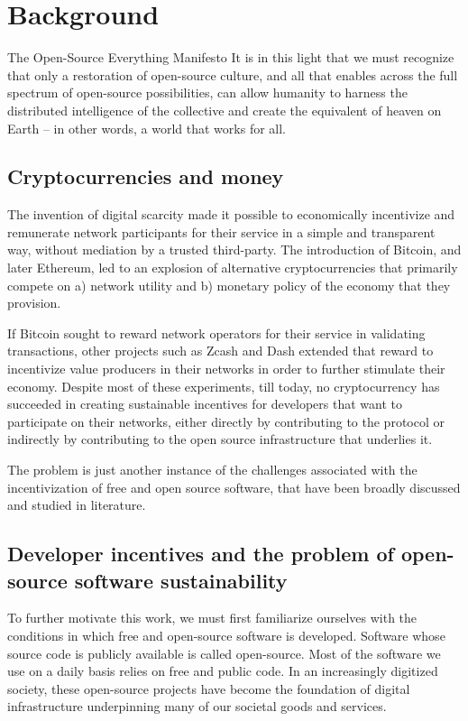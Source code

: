 \section{Background}

\begin{epigraph}{The Open-Source Everything Manifesto}
    \noindent It is in this light that we must recognize that only a restoration of
    open-source culture, and all that enables across the full spectrum of
    open-source possibilities, can allow humanity to harness the distributed
    intelligence of the collective and create the equivalent of heaven on Earth
    -- in other words, a world that works for all.
\end{epigraph}

\subsection{Cryptocurrencies and money}

The invention of digital scarcity made it possible to economically incentivize
and remunerate network participants for their service in a simple and transparent
way, without mediation by a trusted third-party. The introduction of Bitcoin,
and later Ethereum, led to an explosion of alternative cryptocurrencies that
primarily compete on a) network utility and b) monetary policy of the economy
that they provision.

If Bitcoin sought to reward network operators for their service in validating
transactions, other projects such as Zcash and Dash extended that reward to
incentivize value producers in their networks in order to further stimulate
their economy. Despite most of these experiments, till today, no cryptocurrency
has succeeded in creating sustainable incentives for developers that want to
participate on their networks, either directly by contributing to the protocol
or indirectly by contributing to the open source infrastructure that underlies
it.

The problem is just another instance of the challenges associated with the
incentivization of free and open source software, that have been broadly
discussed and studied in literature.

\subsection{Developer incentives and the problem of open-source software
sustainability}

To further motivate this work, we must first familiarize ourselves with the
conditions in which free and open-source software is developed. Software whose
source code is publicly available is called open-source. Most of the software
we use on a daily basis relies on free and public code. In an increasingly
digitized society, these open-source projects have become the foundation of
digital infrastructure underpinning many of our societal goods and services.

